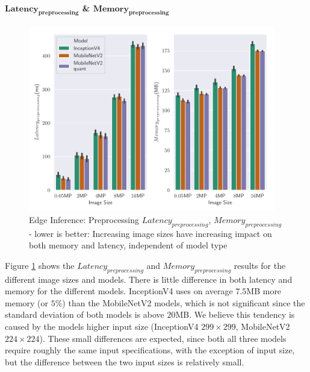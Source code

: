 \paragraph{$\mathbf{Latency_{preprocessing}}$ \& $\mathbf{Memory_{preprocessing}}$}
\begin{figure}[!htb]
\centering
\includegraphics[width=0.96\textwidth]{./Bilder/single_plots/edge_inference_plots/Edge_Inference_Preprocessing.pdf}
\caption[Edge Inference: Preprocessing $Latency_{preprocessing}$, $Memory_{preprocessing}$]{Edge Inference: Preprocessing $Latency_{preprocessing}$, $Memory_{preprocessing}$ -  lower is better: Increasing image sizes have increasing impact on both memory and latency, independent of model type}
\label{fig:EdgePrepro}
\end{figure}
Figure \ref{fig:EdgePrepro} shows the $Latency_{preprocessing}$ and $Memory_{preprocessing}$ results for the different image sizes and models.
There is little difference in both latency and memory for the different models. 
InceptionV4 uses on average $7.5$MB more memory (or $5\%$) than the MobileNetV2 models, which is not significant since the standard deviation of both models is above $20$MB.
We believe this tendency is caused by the models higher input size (InceptionV4 $299\times299$, MobileNetV2 $224\times224$). 
These small differences are expected, since both all three models require roughly the same input specifications, with the exception of input size, but the difference between the two input sizes is relatively small.

